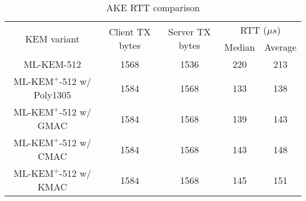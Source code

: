 \documentclass[journal=tches,submission]{iacrtrans}
\newcommand{\us}{\mu s}
\def\mlkemplus{\text{ML-KEM}^+}
\begin{document}
\begin{table}[h]
    \centering
    \footnotesize
    \caption{AKE RTT comparison}\label{tbl:ake-rtt}
    \begin{tabular}{|c|c|c|c|c|}
        \hline
        \multirow{2}{*}{KEM variant}
        & \multirow{2}{*}{Client TX bytes}
        & \multirow{2}{*}{Server TX bytes}
        & \multicolumn{2}{|c|}{RTT ($\us$)} \\
        \cline{4-5}
        & & & Median & Average \\
        \hline
        ML-KEM-512 & 1568 & 1536 & 220 & 213 \\
        \hline
        $\mlkemplus$-512 w/ Poly1305 & 1584 & 1568 & 133 & 138 \\
        \hline
        $\mlkemplus$-512 w/ GMAC & 1584 & 1568 & 139 & 143 \\
        \hline
        $\mlkemplus$-512 w/ CMAC & 1584 & 1568 & 143 & 148 \\
        \hline
        $\mlkemplus$-512 w/ KMAC & 1584 & 1568 & 145 & 151 \\
        \hline
    \end{tabular}\vspace{0.3cm}

\end{table}
\end{document}
